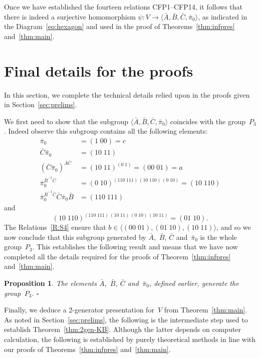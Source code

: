 \documentclass[a4paper,11pt]{article}
\numberwithin{equation}{section}
\newcommand{\nbd}{\nobreakdash-}
\newcommand{\swap}[2]{(#1\;#2)}
\newcommand{\qed}{\hspace*{\fill}$\square$}
\newtheorem{prop}[thm]{Proposition}
\begin{document}
Once we have established the fourteen relations CFP1--CFP14, it
follows that there is indeed a surjective homomorphism $\psi \colon V
\to \langle \bar{A}, \bar{B}, \bar{C}, \bar{\pi}_{0} \rangle$, as
indicated in the Diagram~\eqref{eq:hexagon} and used in the proof of
Theorems~\ref{thm:infpres} and~\ref{thm:main}.


\section{Final details for the proofs}
\label{sec:finaldetails}

In this section, we complete the technical details relied upon in the
proofs given in Section~\ref{sec:prelims}.

We first need to show that the subgroup $\langle \bar{A}, \bar{B},
\bar{C}, \bar{\pi}_{0} \rangle$ coincides with the group~$P_{3}$.
Indeed observe this subgroup contains all the following elements:
\begin{align*}
  \bar{\pi}_{0} &= \swap{1}{00} = c \\
  \bar{C} \bar{\pi}_{0} &= \swap{10}{11} \\
  ( \bar{C} \bar{\pi}_{0} )^{\bar{A} \bar{C}} &=
  \swap{10}{11}^{\swap{0}{1}} = \swap{00}{01} = a \\
  \bar{\pi}_{0}^{\bar{B}^{-1} \bar{C}} &=
  \swap{0}{10}^{\swap{110}{111} \, \swap{10}{110} \, \swap{0}{10}} =
  \swap{10}{110} \\
  \bar{\pi}_{0}^{\bar{B}^{-1} \bar{C}} \bar{C} \bar{\pi}_{0} \bar{B}
  &= \swap{110}{111}
\end{align*}
and
\[
\swap{10}{110}^{\swap{110}{111} \, \swap{10}{11} \, \swap{0}{10} \,
  \swap{10}{11}} = \swap{01}{10}.
\]
The Relations~\ref{R:S4} ensure that $b \in \langle \swap{00}{01} ,
\swap{01}{10} , \swap{10}{11} \rangle$, and so we now conclude that
this subgroup generated by $\bar{A}$,~$\bar{B}$, $\bar{C}$
and~$\bar{\pi}_{0}$ is the whole group~$P_{3}$.  This establishes the
following result and means that we have now completed all the details
required for the proofs of Theorem~\ref{thm:infpres}
and~\ref{thm:main}.

\begin{prop}
  \label{prop:P3-gens}
  The elements $\bar{A}$,~$\bar{B}$, $\bar{C}$ and~$\bar{\pi}_{0}$,
  defined earlier, generate the group~$P_{3}$. \qed
\end{prop}

Finally, we deduce a $2$\nbd generator presentation for~$V$ from
Theorem~\ref{thm:main}.  As noted in Section~\ref{sec:prelims}, the
following is the intermediate step used to establish
Theorem~\ref{thm:2gen-KB}.  Although the latter depends on computer
calculation, the following is established by purely theoretical
methods in line with our proofs of Theorems~\ref{thm:infpres}
and~\ref{thm:main}.
\end{document}
